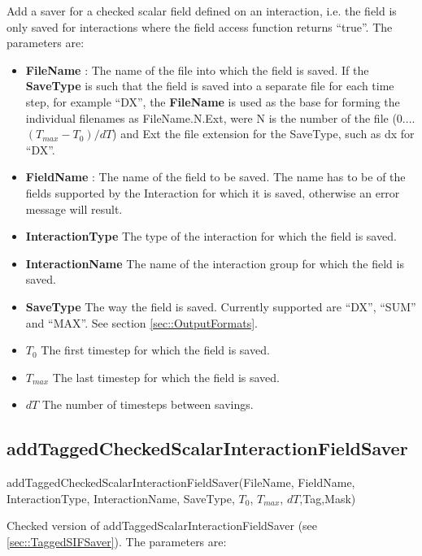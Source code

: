 \documentclass{report}
\begin{document}
Add a saver for a checked scalar field defined on an interaction, i.e. the field is only saved for interactions where the field access function returns ``true''.  The parameters are:

\begin{itemize}
\item \textbf{FileName} : The name of the file into which the field is saved. If the  \textbf{SaveType} is such that the field is saved into a separate file for each time step, for example ``DX'', the \textbf{FileName} is used as the base for forming the individual filenames as FileName.N.Ext, were N is the number of the file (0....$(T_{max}-T_0)/dT$) and Ext the file extension for the SaveType, such as dx for ``DX''.
\item \textbf{FieldName} : The name of the field to be saved. The name has to be of the fields supported by the Interaction for which it is saved, otherwise an error message will result.
\item \textbf{InteractionType} The type of the interaction for which the field is saved.
\item \textbf{InteractionName} The name of the interaction group for which the field is saved.
\item \textbf{SaveType} The way the field is saved. Currently supported are ``DX'', ``SUM'' and ``MAX''. See section \ref{sec::OutputFormats}.
\item \textbf{$T_0$} The first timestep for which the field is saved.
\item \textbf{$T_{max}$} The last timestep for which the field is saved.
\item \textbf{$dT$} The number of timesteps between savings.
\end{itemize}


\subsection{addTaggedCheckedScalarInteractionFieldSaver}

\textsf{addTaggedCheckedScalarInteractionFieldSaver(FileName, FieldName, InteractionType, InteractionName, SaveType, $T_0$, $T_{max}$, $dT$,Tag,Mask)}
\par \medskip

Checked version of \textsf{addTaggedScalarInteractionFieldSaver} (see \ref{sec::TaggedSIFSaver}). The parameters are:
\end{document}
